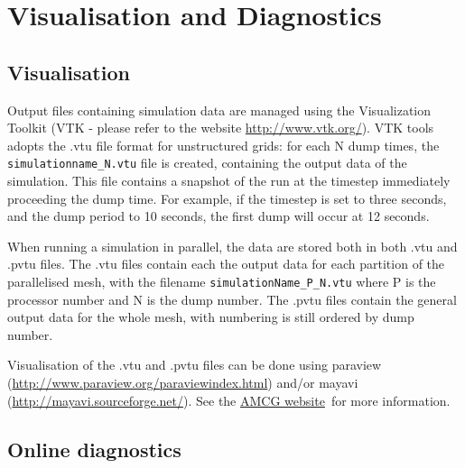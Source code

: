 \chapter{Visualisation and Diagnostics}
\label{chap:visualisation_and_diagnostics}


\section{Visualisation}

\label{sec:mayavi}
\label{sec:paraview}

Output files containing simulation data are managed using the Visualization Toolkit (VTK - please
refer to the website \url{http://www.vtk.org/}). VTK tools adopts the .vtu file format for
unstructured grids: for each N dump times, the \texttt{simulationname\_N.vtu} file is created,
containing the output data of the simulation. This file contains a snapshot of the run at the timestep
immediately proceeding the dump time. For example, if the timestep is set to three seconds, and the
dump period to 10 seconds, the first dump will occur at 12 seconds.

When running a simulation in parallel, the data are stored both in both .vtu and .pvtu files.
The .vtu files contain each the output data for each partition of the parallelised mesh, with
the filename \texttt{simulationName\_P\_N.vtu} where P is the processor number and N is the
dump number. The .pvtu files contain the general output data for the whole mesh, with
numbering is still ordered by dump number.

Visualisation of the .vtu and .pvtu files can be done using paraview
(\url{http://www.paraview.org/paraviewindex.html}) and/or mayavi (\url{http://mayavi.sourceforge.net/}).
See the \href{http://amcg-www.ese.ic.ac.uk/}{AMCG website}\ for more information.



\section{Online diagnostics}
\label{sec:online_diagnostics}

